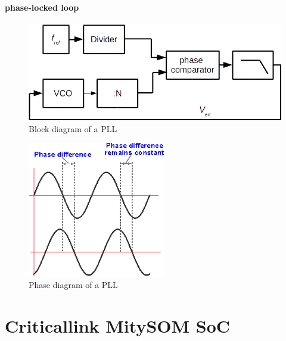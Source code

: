 \paragraph{phase-locked loop}
\begin{figure}[htbp]
\begin{center}
\includegraphics[width=12cm,keepaspectratio=true]{bilder/png/PLLblocks}
\caption{Block diagram of a PLL}
\label{fig:pllblocks}
\end{center}
\end{figure}
\begin{figure}[htbp]
\begin{center}
\includegraphics[width=6cm,keepaspectratio=true]{bilder/png/PLLphase}
\caption{Phase diagram of a PLL}
\label{fig:pllphase}
\end{center}
\end{figure}

\section{Criticallink MitySOM SoC}
